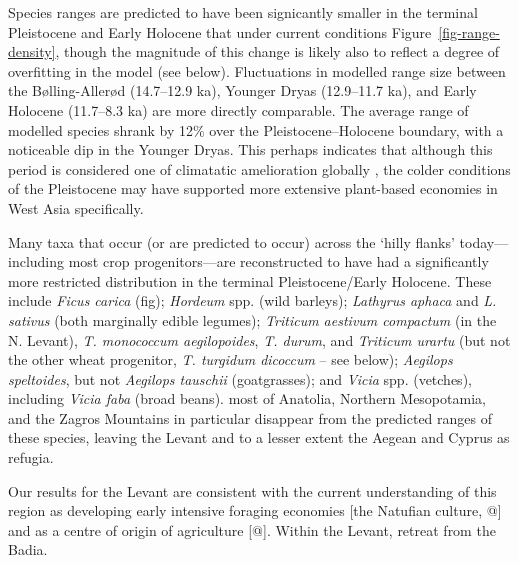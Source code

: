 \documentclass[
  authoryear,
  preprint]{elsarticle}
\begin{document}
Species ranges are predicted to have been signicantly smaller in the
terminal Pleistocene and Early Holocene that under current conditions
Figure~\ref{fig-range-density}, though the magnitude of this change is
likely also to reflect a degree of overfitting in the model (see below).
Fluctuations in modelled range size between the Bølling-Allerød
(14.7--12.9 ka), Younger Dryas (12.9--11.7 ka), and Early Holocene
(11.7--8.3 ka) are more directly comparable. The average range of
modelled species shrank by 12\% over the Pleistocene--Holocene boundary,
with a noticeable dip in the Younger Dryas. This perhaps indicates that
although this period is considered one of climatatic amelioration
globally \citep{JonesEtAl2019}, the colder conditions of the Pleistocene
may have supported more extensive plant-based economies in West Asia
specifically.

Many taxa that occur (or are predicted to occur) across the `hilly
flanks' today---including most crop progenitors---are reconstructed to
have had a significantly more restricted distribution in the terminal
Pleistocene/Early Holocene. These include \emph{Ficus carica} (fig);
\emph{Hordeum} spp. (wild barleys); \emph{Lathyrus aphaca} and \emph{L.
sativus} (both marginally edible legumes); \emph{Triticum aestivum
compactum} (in the N. Levant), \emph{T. monococcum aegilopoides},
\emph{T. durum}, and \emph{Triticum urartu} (but not the other wheat
progenitor, \emph{T. turgidum dicoccum} -- see below); \emph{Aegilops
speltoides}, but not \emph{Aegilops tauschii} (goatgrasses); and
\emph{Vicia} spp. (vetches), including \emph{Vicia faba} (broad beans).
most of Anatolia, Northern Mesopotamia, and the Zagros Mountains in
particular disappear from the predicted ranges of these species, leaving
the Levant and to a lesser extent the Aegean and Cyprus as refugia.

Our results for the Levant are consistent with the current understanding
of this region as developing early intensive foraging economies {[}the
Natufian culture, @{]} and as a centre of origin of agriculture {[}@{]}.
Within the Levant, retreat from the Badia.
\end{document}
